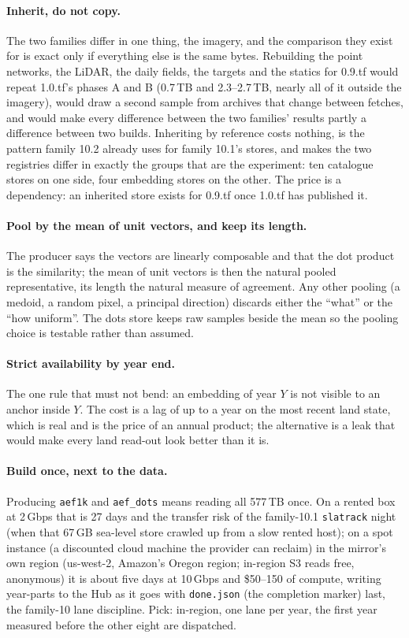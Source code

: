 \documentclass[10pt]{article}
\newcommand{\code}[1]{\texttt{#1}}
\begin{document}
\paragraph{Inherit, do not copy.} The two families differ in one thing,
the imagery, and the comparison they exist for is exact only if everything
else is the same bytes. Rebuilding the point networks, the LiDAR, the daily
fields, the targets and the statics for 0.9.tf would repeat 1.0.tf's phases A
and B (0.7\,TB and 2.3--2.7\,TB, nearly all of it outside the imagery), would
draw a second sample from archives that change between fetches, and would
make every difference between the two families' results partly a difference
between two builds. Inheriting by reference costs nothing, is the pattern
family 10.2 already uses for family 10.1's stores, and makes the two
registries differ in exactly the groups that are the experiment: ten
catalogue stores on one side, four embedding stores on the other. The price
is a dependency: an inherited store exists for 0.9.tf once 1.0.tf has
published it.

\paragraph{Pool by the mean of unit vectors, and keep its length.} The
producer says the vectors are linearly composable and that the dot product
is the similarity; the mean of unit vectors is then the natural pooled
representative, its length the natural measure of agreement. Any other
pooling (a medoid, a random pixel, a principal direction) discards either
the ``what'' or the ``how uniform''. The dots store keeps raw samples beside
the mean so the pooling choice is testable rather than assumed.

\paragraph{Strict availability by year end.} The one rule that must not
bend: an embedding of year $Y$ is not visible to an anchor inside $Y$. The
cost is a lag of up to a year on the most recent land state, which is real
and is the price of an annual product; the alternative is a leak that would
make every land read-out look better than it is.

\paragraph{Build once, next to the data.} Producing \code{aef1k} and
\code{aef\_dots} means reading all 577\,TB once. On a rented box at
2\,Gbps that is 27 days and the transfer risk of the family-10.1
\code{slatrack} night (when that 67\,GB sea-level store crawled up from a slow rented host); on a spot instance (a discounted cloud machine the provider can reclaim) in the mirror's own region
(us-west-2, Amazon's Oregon region; in-region S3 reads free, anonymous) it is about five days at
10\,Gbps and \$50--150 of compute, writing year-parts to the Hub as it goes
with \code{done.json} (the completion marker) last, the family-10 lane discipline. Pick: in-region,
one lane per year, the first year measured before the other eight are
dispatched.
\end{document}
